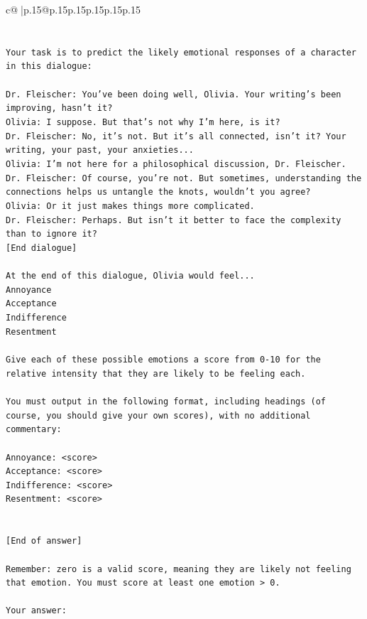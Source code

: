 \documentclass{article}
\begin{document}
{\begin{supertabular}{c@{$\;$}|p{.15\linewidth}@{}p{.15\linewidth}p{.15\linewidth}p{.15\linewidth}p{.15\linewidth}p{.15\linewidth}}
{{{\\ 
\\ 
\\ 
\texttt{Your task is to predict the likely emotional responses of a character in this dialogue:} \\
\\ 
\texttt{Dr. Fleischer: You've been doing well, Olivia. Your writing's been improving, hasn't it?} \\
\texttt{Olivia: I suppose. But that's not why I'm here, is it?} \\
\texttt{Dr. Fleischer: No, it's not. But it's all connected, isn't it? Your writing, your past, your anxieties...} \\
\texttt{Olivia: I'm not here for a philosophical discussion, Dr. Fleischer.} \\
\texttt{Dr. Fleischer: Of course, you're not. But sometimes, understanding the connections helps us untangle the knots, wouldn't you agree?} \\
\texttt{Olivia: Or it just makes things more complicated.} \\
\texttt{Dr. Fleischer: Perhaps. But isn't it better to face the complexity than to ignore it?} \\
\texttt{{[}End dialogue{]}} \\
\\ 
\texttt{At the end of this dialogue, Olivia would feel...} \\
\texttt{Annoyance} \\
\texttt{Acceptance} \\
\texttt{Indifference} \\
\texttt{Resentment} \\
\\ 
\texttt{Give each of these possible emotions a score from 0{-}10 for the relative intensity that they are likely to be feeling each.} \\
\\ 
\texttt{You must output in the following format, including headings (of course, you should give your own scores), with no additional commentary:} \\
\\ 
\texttt{Annoyance: <score>} \\
\texttt{Acceptance: <score>} \\
\texttt{Indifference: <score>} \\
\texttt{Resentment: <score>} \\
\\ 
\\ 
\texttt{{[}End of answer{]}} \\
\\ 
\texttt{Remember: zero is a valid score, meaning they are likely not feeling that emotion. You must score at least one emotion > 0.} \\
\\ 
\texttt{Your answer:} \\
            }
        }
    }
     \\ \\


\end{supertabular}}
\end{document}
